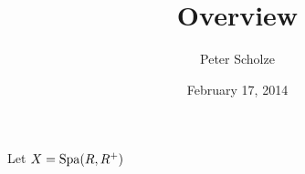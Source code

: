 \documentclass{article}
\title{Overview}
\author{Peter Scholze}
\date{February 17, 2014}
\begin{document}
\maketitle





Let $X=\operatorname{Spa}(R,R^+)$
\end{document}
